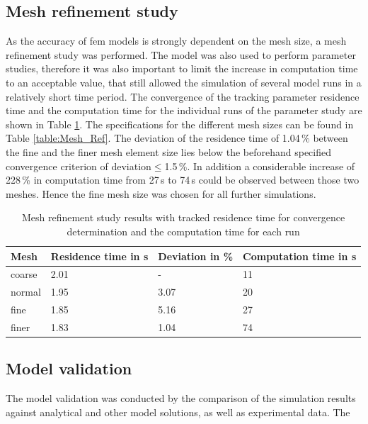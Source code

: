 \subsection{Mesh refinement study}
\label{subsec:mesh_ref}
As the accuracy of \gls{fem} models is strongly dependent on the mesh size, a mesh refinement study was performed. The model was also used to perform parameter studies, therefore it was also important to limit the increase in computation time to an acceptable value, that still allowed the simulation of several model runs in a  relatively short time period. The convergence of the tracking parameter residence time and the computation time for the individual runs of the parameter study are shown in Table \ref{table:Mesh_Ref_res}. The specifications for the different mesh sizes can be found in Table \ref{table:Mesh_Ref}. The deviation of the residence time of 1.04\,\% between the fine and the finer mesh element size lies below the beforehand specified convergence criterion of deviation$\leq$1.5\,\%. In addition a considerable increase of 228\,\% in computation time from 27\,s to 74\,s could be observed between those two meshes. Hence the fine mesh size was chosen for all further simulations. 

\begin{table}[H]
\centering
\caption[Mesh refinement study results]{Mesh refinement study results with tracked residence time for convergence determination and the computation time for each run}
\label{table:Mesh_Ref_res}
\begin{tabularx}{\textwidth}{XXXX}
\hline
Mesh & Residence time in s & Deviation in \% & Computation time in s\\
\hline\hline
coarse &  2.01 & -  & 11\\
normal & 1.95 & 3.07 & 20\\
fine &  1.85 & 5.16 & 27 \\
finer &  1.83 & 1.04 & 74\\
\hline
\end{tabularx}
\end{table}

\subsection{Model validation}
\label{subsec:mod_val}

The model validation was conducted by the comparison of the simulation results against analytical and other model solutions, as well as experimental data. The 

